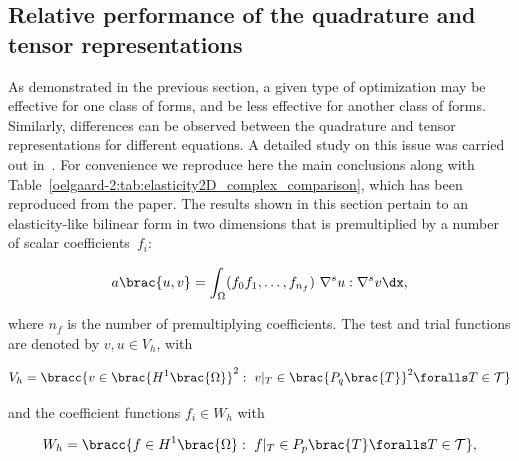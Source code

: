 \subsection{Relative performance of the quadrature and tensor
  representations}
\label{oelgaard-2:sec:performance_of_representations}

As demonstrated in the previous section, a given type of optimization
may be effective for one class of forms, and be less effective for
another class of forms.  Similarly, differences can be observed
between the quadrature and tensor representations for different
equations.  A detailed study on this issue was carried out
in~\citet{OelgaardWells2010}.  For convenience we reproduce here the
main conclusions along with
Table~\ref{oelgaard-2:tab:elasticity2D_complex_comparison}, which has
been reproduced from the paper.  The results shown in this section
pertain to an elasticity-like bilinear form in two dimensions that is
premultiplied by a number of scalar coefficients~$f_{i}$:

\begin{equation}
  a\brac{u, v} = \int_{\Omega} (f_0 f_1, \ldots, f_{n_f} )\ \nabla^s u
  : \nabla^s v \dx,
  \label{oelgaard-2:eq:elasticity_form}
\end{equation}

where $n_f$ is the number of premultiplying coefficients.  The test
and trial functions are denoted by $v, u \in V_{h}$, with

\begin{equation}
  V_{h} = \bracc{v \in \brac{H^{1}\brac{\Omega}}^2: \ v\vert_T \in
    \brac{P_{q}\brac{T}}^2 \foralls T \in \mathcal{T}}
 \label{oelgaard-2:eq:elastictity_H1_vector_space}
\end{equation}

and the coefficient functions $f_{i} \in W_{h}$ with

\begin{equation}
  W_{h} = \bracc{f \in H^{1}\brac{\Omega}: \ f\vert_T \in
    P_{p}\brac{T} \foralls T \in \mathcal{T}},
 \label{oelgaard-2:eq:elasticity_H1_space}
\end{equation}

